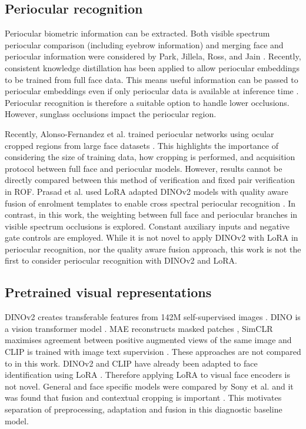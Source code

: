\documentclass[10pt,lettersize,journal]{IEEEtran}
\begin{document}
\subsection{Periocular recognition}
Periocular biometric information can be extracted. Both visible spectrum periocular comparison (including eyebrow information) and merging face and periocular information were considered by Park, Jillela, Ross, and Jain \cite{periocular}. Recently, consistent knowledge distillation has been applied to allow periocular embeddings to be trained from full face data. This means useful information can be passed to periocular embeddings even if only periocular data is available at inference time \cite{ckd2024}. Periocular recognition is therefore a suitable option to handle lower occlusions. However, sunglass occlusions impact the periocular region.\par
Recently, Alonso-Fernandez et al. trained periocular networks using ocular cropped regions from large face datasets \cite{ocularcrop2025}. This highlights the importance of considering the size of training data, how cropping is performed, and acquisition protocol between full face and periocular models. However, results cannot be directly compared between this method of verification and fixed pair verification in ROF. Prasad et al. used LoRA adapted DINOv2 models with quality aware fusion of enrolment templates to enable cross spectral periocular recognition \cite{perilora2026}. In contrast, in this work, the weighting between full face and periocular branches in visible spectrum occlusions is explored. Constant auxiliary inputs and negative gate controls are employed. While it is not novel to apply DINOv2 with LoRA in periocular recognition, nor the quality aware fusion approach, this work is not the first to consider periocular recognition with DINOv2 and LoRA.\par
\subsection{Pretrained visual representations}
DINOv2 creates transferable features from 142M self-supervised images \cite{dinov2}. DINO is a vision transformer model \cite{dino}. MAE reconstructs masked patches \cite{mae}, SimCLR maximises agreement between positive augmented views of the same image \cite{simclr} and CLIP is trained with image text supervision \cite{clip}. These approaches are not compared to in this work. DINOv2 and CLIP have already been adapted to face identification using LoRA \cite{froundation2025}. Therefore applying LoRA to visual face encoders is not novel. General and face specific models were compared by Sony et al. and it was found that fusion and contextual cropping is important \cite{foundationcomparison2025}. This motivates separation of preprocessing, adaptation and fusion in this diagnostic baseline model.\par
\end{document}
